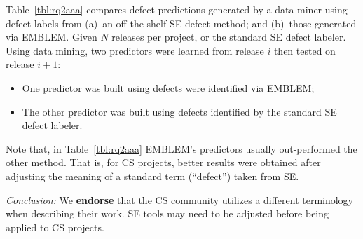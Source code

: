 \documentclass[sigconf,review,anonymous]{acmart}
\newcommand{\bi}{\begin{itemize}}
\newcommand{\ei}{\end{itemize}}
\newenvironment{RQ}{\vspace{1mm}\begin{tcolorbox}[enhanced,width=3.4in,size=fbox,colback=red!5!white,drop shadow southeast,sharp corners]}{\end{tcolorbox}}
\begin{document}
Table~\ref{tbl:rq2aaa} 
compares defect predictions generated by a data
miner using defect labels from (a)~an  off-the-shelf SE defect method;
and (b)~those generated via EMBLEM. 
Given $N$ releases per project, or the standard SE defect labeler.
Using data mining, two predictors were learned from release $i$ then tested on release $i+1$:
\bi
\item
One predictor was built using defects were identified  via EMBLEM;
\item
The other predictor was built using defects identified by the standard SE defect labeler.
\ei
Note that, in Table~\ref{tbl:rq2aaa}  EMBLEM's predictors usually out-performed the other method.
That is, for CS projects,
better results were obtained after adjusting the meaning of a standard term (``defect'')
taken from SE.




\begin{RQ}
\textit{\underline{Conclusion:}} We \textbf{endorse} that the CS community utilizes a different terminology when describing their work. SE tools
may need to be adjusted before being applied to CS projects.
\end{RQ}




\end{document}

